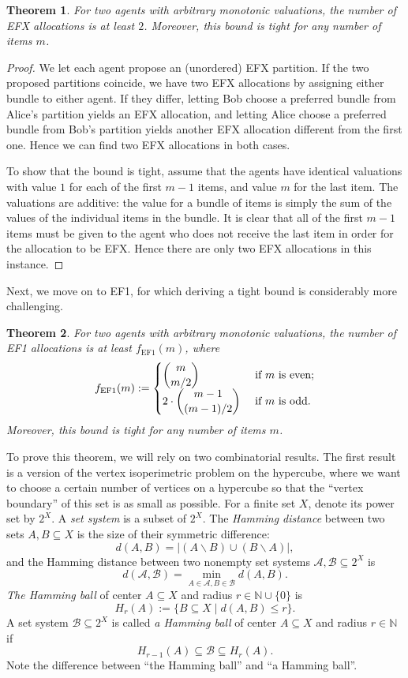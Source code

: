 \documentclass[11pt]{scrartcl}
\newtheorem{theorem}{Theorem}
\theoremstyle{definition}
\begin{document}
\begin{theorem}
For two agents with arbitrary monotonic valuations, the number of EFX allocations is at least $2$.
Moreover, this bound is tight for any number of items $m$.
\end{theorem}

\begin{proof}
We let each agent propose an (unordered) EFX partition.
If the two proposed partitions coincide, we have two EFX allocations by assigning either bundle to either agent.
If they differ, letting Bob choose a preferred bundle from Alice's partition yields an EFX allocation, and letting Alice choose a preferred bundle from Bob's partition yields another EFX allocation different from the first one.
Hence we can find two EFX allocations in both cases.

To show that the bound is tight, assume that the agents have identical valuations with value $1$ for each of the first $m-1$ items, and value $m$ for the last item. 
The valuations are additive: the value for a bundle of items is simply the sum of the values of the individual items in the bundle.
It is clear that all of the first $m-1$ items must be given to the agent who does not receive the last item in order for the allocation to be EFX.
Hence there are only two EFX allocations in this instance.
\end{proof}

Next, we move on to EF1, for which deriving a tight bound is considerably more challenging.

\begin{theorem}
\label{thm:EF1}
For two agents with arbitrary monotonic valuations, the number of EF1 allocations is at least $f_{\text{EF1}}(m)$, where
\[
f_{\text{EF1}}(m) := 
\begin{cases}
\dbinom{m}{m/2} & \text{ if } m \text{ is even;} \\
2\cdot\dbinom{m-1}{(m-1)/2} & \text{ if } m \text{ is odd.}
\end{cases}
\]
Moreover, this bound is tight for any number of items $m$.
\end{theorem}

To prove this theorem, we will rely on two combinatorial results.
The first result is a version of the vertex isoperimetric problem on the hypercube, where we want to choose a certain number of vertices on a hypercube so that the ``vertex boundary'' of this set is as small as possible.
For a finite set $X$, denote its power set by $2^X$.
A \emph{set system} is a subset of $2^X$.
The \emph{Hamming distance} between two sets $A,B\subseteq X$ is the size of their symmetric difference: 
$$d(A,B) = |(A\backslash B)\cup(B\backslash A)|,$$
and the Hamming distance between two nonempty set systems $\mathcal{A},\mathcal{B}\subseteq 2^X$ is
$$d(\mathcal{A},\mathcal{B}) = \min_{A\in\mathcal{A},B\in\mathcal{B}}d(A,B).$$
\emph{The Hamming ball} of center $A\subseteq X$ and radius $r\in\mathbb{N}\cup\{0\}$ is
$$H_r(A) := \{B\subseteq X\mid d(A,B)\leq r\}.$$
A set system $\mathcal{B}\subseteq 2^X$ is called \emph{a Hamming ball} of center $A\subseteq X$ and radius $r\in \mathbb{N}$ if
$$H_{r-1}(A)\subseteq\mathcal{B}\subseteq H_r(A).$$
Note the difference between ``the Hamming ball'' and ``a Hamming ball''.
\end{document}

